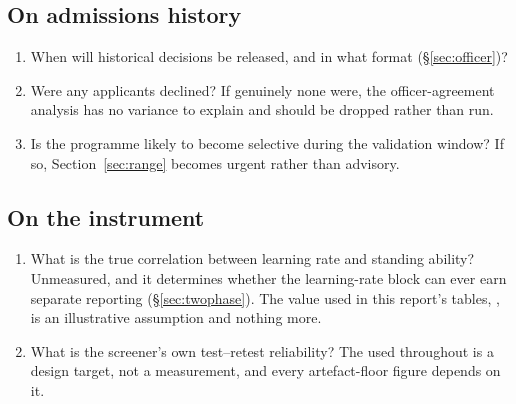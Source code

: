 \documentclass[11pt,a4paper]{article}
\begin{document}
\subsection*{On admissions history}
\begin{enumerate}[leftmargin=1.6em,itemsep=0.15em,start=15]
\item When will historical decisions be released, and in what format
(\S\ref{sec:officer})?
\item Were any applicants declined? If genuinely none were, the officer-agreement
analysis has no variance to explain and should be dropped rather than run.
\item Is the programme likely to become selective during the validation window?
If so, Section~\ref{sec:range} becomes urgent rather than advisory.
\end{enumerate}

\subsection*{On the instrument}
\begin{enumerate}[leftmargin=1.6em,itemsep=0.15em,start=18]
\item What is the true correlation between learning rate and standing ability?
Unmeasured, and it determines whether the learning-rate block can ever earn
separate reporting (\S\ref{sec:twophase}). The value used in this report's
tables, \RhoLRstanding{}, is an illustrative assumption and nothing more.
\item What is the screener's own test--retest reliability? The
\RelScreener{} used throughout is a design target, not a measurement, and every
artefact-floor figure depends on it.
\end{enumerate}
\end{document}
